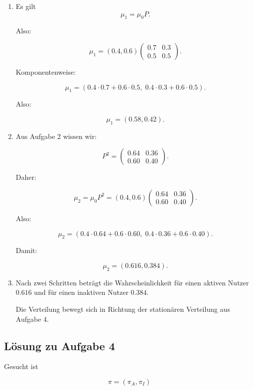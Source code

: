 \documentclass[11pt,a4paper]{article}
\begin{document}
\begin{enumerate}
    \item Es gilt
    \[
    \mu_1 = \mu_0P.
    \]

    Also:

    \[
    \mu_1
    =
    (0.4,0.6)
    \begin{pmatrix}
    0.7 & 0.3 \\
    0.5 & 0.5
    \end{pmatrix}.
    \]

    Komponentenweise:

    \[
    \mu_1 =
    (0.4\cdot 0.7 + 0.6\cdot 0.5,\;
     0.4\cdot 0.3 + 0.6\cdot 0.5).
    \]

    Also:

    \[
    \mu_1=(0.58,0.42).
    \]

    \item Aus Aufgabe 2 wissen wir:

    \[
    P^2 =
    \begin{pmatrix}
    0.64 & 0.36 \\
    0.60 & 0.40
    \end{pmatrix}.
    \]

    Daher:

    \[
    \mu_2 = \mu_0P^2
    =
    (0.4,0.6)
    \begin{pmatrix}
    0.64 & 0.36 \\
    0.60 & 0.40
    \end{pmatrix}.
    \]

    Also:

    \[
    \mu_2 =
    (0.4\cdot 0.64 + 0.6\cdot 0.60,\;
     0.4\cdot 0.36 + 0.6\cdot 0.40).
    \]

    Damit:

    \[
    \mu_2=(0.616,0.384).
    \]

    \item Nach zwei Schritten beträgt die Wahrscheinlichkeit für einen aktiven Nutzer $0.616$ und für einen inaktiven Nutzer $0.384$.

    Die Verteilung bewegt sich in Richtung der stationären Verteilung aus Aufgabe 4.
\end{enumerate}

\subsection*{Lösung zu Aufgabe 4}

Gesucht ist

\[
\pi=(\pi_A,\pi_I)
\]
\end{document}
